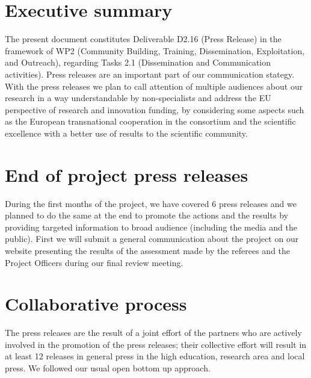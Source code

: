 \documentclass{deliverablereport}
\author{Izabela Faguet, Viviane Pons, Nicolas M. Thiéry}
\begin{document}
\maketitle
\githubissuedescription


\section{Executive summary}


The present document constitutes Deliverable D2.16 (Press Release) in the framework of WP2
(Community Building, Training, Dissemination, Exploitation, and Outreach), regarding Tasks 2.1 
(Dissemination and Communication activities). Press releases are an important 
part of our communication stategy. With the press releases we plan to call
attention of multiple audiences about our research in a way understandable
by non-specialists and address the EU perspective of research and innovation 
funding, by considering some aspects such as the European transnational 
cooperation in the consortium and the scientific excellence with a better use
of results to the scientific community.

\section{End of project press releases}


During the first months of the project, we have covered 6 press releases and we
planned to do the same at the end to promote the actions and the results by providing
targeted information to broad audience (including the media and the public).
First we will submit a general communication about the project on our website presenting 
the results of the assessment made by the referees and the Project Officers during our 
final review meeting.

\section{Collaborative process}

The press releases are the result of a joint effort of the partners
who are actively involved in the promotion of the press releases;
their collective effort will result in at least 12 releases in general
press in the high education, research area and local press. We
followed our usual open bottom up approach. %
\end{document}
